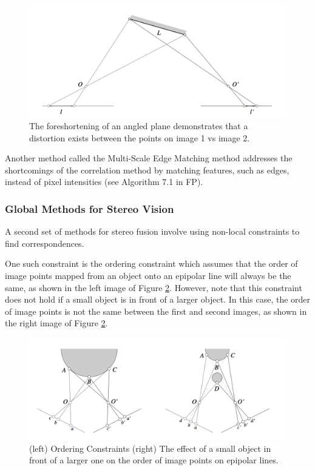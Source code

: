 \documentclass[twoside]{article}
\begin{document}
\begin{figure}[h!]
  \begin{center}
	\includegraphics[scale=0.5]{ForeshorteningEffect.png}  \end{center}
  \caption{The foreshortening of an angled plane demonstrates that a distortion exists between the points on image 1 vs image 2.}
  \label{ForeshorteningEffect}
\end{figure}


Another method called the Multi-Scale Edge Matching method addresses the shortcomings of the correlation method by matching features, such as edges, instead of pixel intensities (see Algorithm 7.1 in FP). 

\subsubsection{Global Methods for Stereo Vision}
A second set of methods for stereo fusion involve using non-local constraints to find correspondences. 

One such constraint is the ordering constraint which assumes that the order of image points mapped from an object onto an epipolar line will always be the same, as shown in the left image of Figure \ref{OrderingConstraint}. However, note that this constraint does not hold if a small object is in front of a larger object. In this case, the order of image points is not the same between the first and second images, as shown in the right image of Figure \ref{OrderingConstraint}. 

\begin{figure}[h!]
  \begin{center}
	\includegraphics[scale=0.5]{OrderingConstraint.png}  \end{center}
  \caption{(left) Ordering Constraints (right) The effect of a small object in front of a larger one on the order of image points on epipolar lines.}
  \label{OrderingConstraint}
\end{figure}
\end{document}
